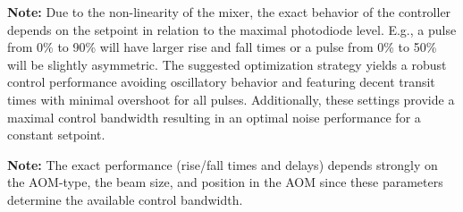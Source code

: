 \documentclass[twoside,a4paper]{refart}
\begin{document}
\textbf{Note:}
Due to the non-linearity of the mixer, the exact behavior of the controller depends on the setpoint in relation to the maximal photodiode level. E.g., a pulse from 0\% to 90\% will have larger rise and fall times or a pulse from 0\% to 50\% will be slightly asymmetric. The suggested optimization strategy yields a robust control performance avoiding oscillatory behavior and featuring decent transit times with minimal overshoot for all pulses. Additionally, these settings provide a maximal control bandwidth resulting in an optimal noise performance for a constant setpoint.

\textbf{Note:}
The exact performance (rise/fall times and delays) depends strongly on the AOM-type, the beam size, and position in the AOM since these parameters determine the available control bandwidth.          
\newpage
\end{document}
